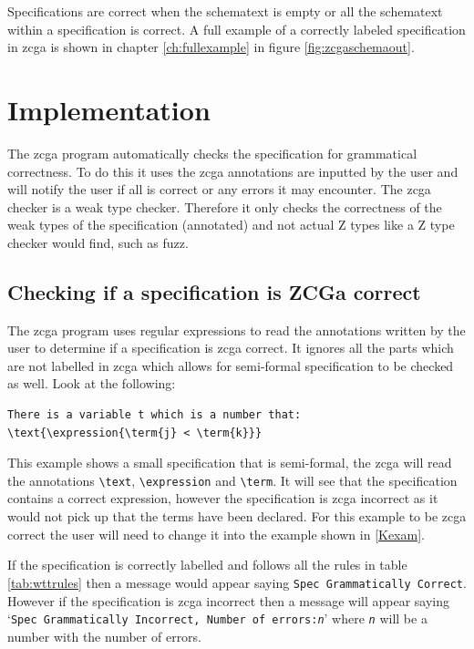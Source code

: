 Specifications are correct when the schematext is empty or all the schematext
within a specification is correct. A full example of a correctly labeled
specification in \gls{zcga} is shown in chapter \ref{ch:fullexample} in figure
\ref{fig:zcgaschemaout}.

\section{Implementation}

The \gls{zcga} program automatically checks the specification for grammatical
correctness. To do this it uses the \gls{zcga} annotations are inputted by the user
and will notify the user if all is correct or any errors it may encounter. The
\gls{zcga} checker is a weak type checker. Therefore it only checks the
correctness of the weak types of the specification (annotated) and not actual Z
types like a Z type checker would find, such as fuzz.

\subsection{Checking if a specification is ZCGa correct}

The \gls{zcga} program uses regular expressions to read the annotations written
by the user to determine if a specification is \gls{zcga} correct. It ignores
all the parts which are not labelled in \gls{zcga} which allows for
semi-formal specification to be checked as well. Look at the following:

\begin{exam}
\begin{verbatim}
There is a variable t which is a number that:
\text{\expression{\term{j} < \term{k}}}
\end{verbatim}
\end{exam}

This example shows a small specification that is semi-formal, the \gls{zcga}
will read the annotations \verb|\text|, \verb|\expression| and \verb|\term|. It
will see that the specification contains a correct expression, however the
specification is \gls{zcga} incorrect as it would not pick up that the terms
have been declared. For this example to be \gls{zcga} correct the user will need
to change it into the example shown in \ref{Kexam}.

If the specification is correctly labelled and follows all the rules in table
\ref{tab:wttrules} then a message would appear saying \texttt{Spec Grammatically
Correct}. However if the specification is \gls{zcga} incorrect then a message
will appear saying `\texttt{Spec Grammatically Incorrect, Number of
errors:\emph{n}}' where \texttt{\emph{n}} will be a number with the number of
errors.

